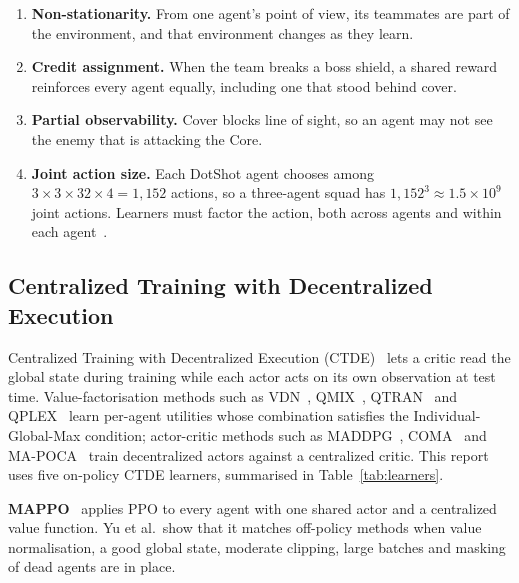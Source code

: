 \documentclass[11pt]{article}
\begin{document}
\begin{enumerate}
    \item \textbf{Non-stationarity.} From one agent's point of view, its teammates are part of the environment, and that environment changes as they learn.
    \item \textbf{Credit assignment.} When the team breaks a boss shield, a shared reward reinforces every agent equally, including one that stood behind cover.
    \item \textbf{Partial observability.} Cover blocks line of sight, so an agent may not see the enemy that is attacking the Core.
    \item \textbf{Joint action size.} Each DotShot agent chooses among $3 \times 3 \times 32 \times 4 = 1{,}152$ actions, so a three-agent squad has $1{,}152^3 \approx 1.5 \times 10^9$ joint actions. Learners must factor the action, both across agents and within each agent~\cite{tavakoli2018branching}.
\end{enumerate}

\subsection{Centralized Training with Decentralized Execution}

Centralized Training with Decentralized Execution (CTDE)~\cite{oliehoek2008optimal,kraemer2016ctde,amato2024ctde} lets a critic read the global state during training while each actor acts on its own observation at test time. Value-factorisation methods such as VDN~\cite{sunehag2018vdn}, QMIX~\cite{rashid2018qmix}, QTRAN~\cite{son2019qtran} and QPLEX~\cite{wang2021qplex} learn per-agent utilities whose combination satisfies the Individual-Global-Max condition; actor-critic methods such as MADDPG~\cite{lowe2017maddpg}, COMA~\cite{foerster2018coma} and MA-POCA~\cite{cohen2022mapoca} train decentralized actors against a centralized critic. This report uses five on-policy CTDE learners, summarised in Table~\ref{tab:learners}.

\textbf{MAPPO}~\cite{yu2022mappo} applies PPO to every agent with one shared actor and a centralized value function. Yu et al.\ show that it matches off-policy methods when value normalisation, a good global state, moderate clipping, large batches and masking of dead agents are in place.
\end{document}
